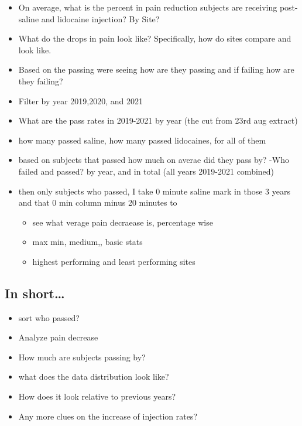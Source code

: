 \documentclass[
]{article}
\providecommand{\tightlist}{%
  \setlength{\itemsep}{0pt}\setlength{\parskip}{0pt}}
\begin{document}
\begin{itemize}
\item
  On average, what is the percent in pain reduction subjects are
  receiving post-saline and lidocaine injection? By Site?
\item
  What do the drops in pain look like? Specifically, how do sites
  compare and look like.
\item
  Based on the passing were seeing how are they passing and if failing
  how are they failing?
\item
  Filter by year 2019,2020, and 2021
\item
  What are the pass rates in 2019-2021 by year (the cut from 23rd aug
  extract)
\item
  how many passed saline, how many passed lidocaines, for all of them
\item
  based on subjects that passed how much on averae did they pass by?
  -Who failed and passed? by year, and in total (all years 2019-2021
  combined)
\item
  then only subjects who passed, I take 0 minute saline mark in those 3
  years and that 0 min column minus 20 minutes to

  \begin{itemize}
  \tightlist
  \item
    see what verage pain decraease is, percentage wise
  \item
    max min, medium,, basic stats
  \item
    highest performing and least performing sites
  \end{itemize}
\end{itemize}

\hypertarget{in-short}{%
\subsection{In short\ldots{}}\label{in-short}}

\begin{itemize}
\tightlist
\item
  sort who passed?
\item
  Analyze pain decrease
\item
  How much are subjects passing by?
\item
  what does the data distribution look like?
\item
  How does it look relative to previous years?
\item
  Any more clues on the increase of injection rates?
\end{itemize}
\end{document}
